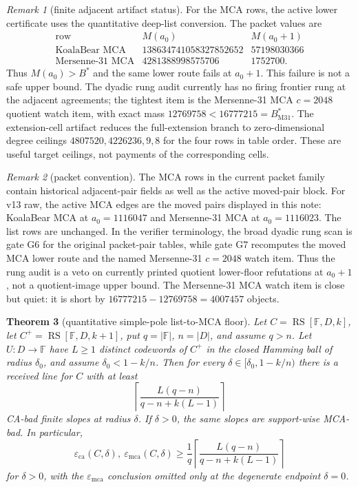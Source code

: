\documentclass[a4paper,11pt]{amsart}
\newtheorem{theorem}{Theorem}[section]
\theoremstyle{remark}
\newtheorem{remark}[theorem]{Remark}
\newcommand{\F}{\mathbb F}
\newcommand{\RS}{\operatorname{RS}}
\newcommand{\emca}{\varepsilon_{\mathrm{mca}}}
\newcommand{\eca}{\varepsilon_{\mathrm{ca}}}
\begin{document}
\begin{remark}[finite adjacent artifact status]\label{rem:finite-artifacts}
For the MCA rows, the active lower certificate uses the quantitative deep-list conversion.  The packet values are
\[
\begin{array}{c|cc}
\text{row} & M(a_0) & M(a_0+1)\\
\hline
\text{KoalaBear MCA} & 138634741058327852652 & 57198030366\\
\text{Mersenne-31 MCA} & 4281388998575706 & 1752700 .
\end{array}
\]
Thus \(M(a_0)>B^*\) and the same lower route fails at \(a_0+1\).  This failure is not a safe upper bound.  The dyadic rung audit currently has no firing frontier rung at the adjacent agreements; the tightest item is the Mersenne-31 MCA \(c=2048\) quotient watch item, with exact mass \(12769758<16777215=B^*_{\mathrm{M31}}\).  The extension-cell artifact reduces the full-extension branch to zero-dimensional degree ceilings \(4807520,4226236,9,8\) for the four rows in table order.  These are useful target ceilings, not payments of the corresponding cells.
\end{remark}

\begin{remark}[packet convention]\label{rem:packet-convention}
The MCA rows in the current packet family contain historical adjacent-pair fields as well as the active moved-pair block.  For v13 raw, the active MCA edges are the moved pairs displayed in this note: KoalaBear MCA at \(a_0=1116047\) and Mersenne-31 MCA at \(a_0=1116023\).  The list rows are unchanged.  In the verifier terminology, the broad dyadic rung scan is gate G6 for the original packet-pair tables, while gate G7 recomputes the moved MCA lower route and the named Mersenne-31 \(c=2048\) watch item.  Thus the rung audit is a veto on currently printed quotient lower-floor refutations at \(a_0+1\), not a quotient-image upper bound.  The Mersenne-31 MCA watch item is close but quiet: it is short by \(16777215-12769758=4007457\) objects.
\end{remark}

\begin{theorem}[quantitative simple-pole list-to-MCA floor]\label{thm:simple-pole-list-floor}
Let \(C=\RS[\F,D,k]\), let \(C^+=\RS[\F,D,k+1]\), put \(q=|\F|\), \(n=|D|\), and assume \(q>n\).  Let \(U:D\to\F\) have \(L\ge1\) distinct codewords of \(C^+\) in the closed Hamming ball of radius \(\delta_0\), and assume \(\delta_0<1-k/n\).  Then for every \(\delta\in[\delta_0,1-k/n)\) there is a received line for \(C\) with at least
\[
        \left\lceil \frac{L(q-n)}{q-n+k(L-1)}\right\rceil
\]
CA-bad finite slopes at radius \(\delta\).  If \(\delta>0\), the same slopes are support-wise MCA-bad.  In particular,
\[
        \eca(C,\delta),\ \emca(C,\delta)
        \ge
        \frac{1}{q}
        \left\lceil \frac{L(q-n)}{q-n+k(L-1)}\right\rceil
\]
for \(\delta>0\), with the \(\emca\) conclusion omitted only at the degenerate endpoint \(\delta=0\).
\end{theorem}
\end{document}
